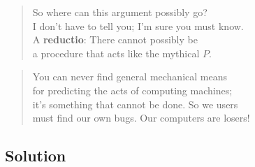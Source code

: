 \begin{verse}
So where can this argument possibly go?\\
I don't have to tell you; I'm sure you must know.\\
A \textbf{reductio}: There cannot possibly be\\
a procedure that acts like the mythical \(P\).
\end{verse}
\begin{verse}
You can never find general mechanical means\\
for predicting the acts of computing machines;\\
it's something that cannot be done. So we users\\
must find our own bugs. Our computers are losers!
\end{verse}

\subsection{Solution}

